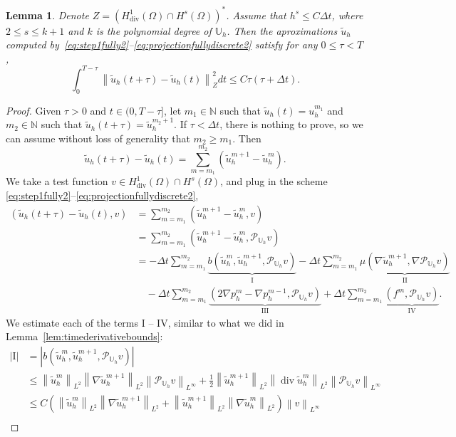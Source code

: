 \documentclass[10pt,letterpaper]{amsart}
\newcommand{\N}{\mathbb{N}}
\newcommand{\tu}{\widetilde{u}}
\newcommand\norm[1]{\left\lVert#1\right\rVert}
\newcommand{\Grad}{\nabla}
\newcommand{\Div}{\operatorname{div}}
\newcommand{\dom}{\Omega}
\newcommand{\Uh}{\mathbb{U}_h}
\newcommand{\PUh}{\mathcal{P}_{\Uh}}
\newtheorem{lemma}{Lemma}[section]
\theoremstyle{definition}{\newtheorem{definition}[lemma]{Definition}}
\numberwithin{equation}{section}
\begin{document}
\begin{lemma}
	\label{lem:timecontinuityutilde}
	Denote $Z = (H^1_{\Div}(\dom)\cap H^s(\dom))^*$. Assume that $h^s\leq C\Delta t$, where $2\leq s\leq k+1$ and $k$ is the polynomial degree of $\Uh$. Then the aproximations $\tu_h$ computed by~\eqref{eq:step1fully2}--\eqref{eq:projectionfullydiscrete2} satisfy for any $0\leq \tau <T$,  
	\begin{equation}
		\label{eq:timecontutildeweak}
		\int_0^{T-\tau}\norm{\tu_h(t+\tau)-\tu_h(t)}_Z^2 dt \leq C \tau (\tau+\Delta t).
	\end{equation}

\end{lemma}
\begin{proof}
	Given $\tau>0$ and $t\in (0,T-\tau]$, let $m_1\in \N$ such that $\tu_h(t) = u_h^{m_1}$ and $ m_2\in \N$ such that $\tu_h(t+\tau) = \tu_h^{m_2+1}$. If $\tau<\Delta t$, there is nothing to prove, so we can assume without loss of generality that $m_2\geq m_1$. Then
	\begin{equation*}
\tu_h(t+\tau)-\tu_h(t) = \sum_{m=m_1}^{m_2} (\tu_h^{m+1}-\tu_h^m).
	\end{equation*}
	We take a test function $v\in H^1_{\Div}(\dom)\cap H^s(\dom)$,  and plug in the scheme \eqref{eq:step1fully2}--\eqref{eq:projectionfullydiscrete2},
	\begin{align*}
		(\tu_h(t+\tau)-\tu_h(t),v) &= \sum_{m=m_1}^{m_2} (\tu_h^{m+1}-\tu_h^m,v)\\
		& = \sum_{m=m_1}^{m_2} (\tu_h^{m+1}-\tu_h^m,\PUh v)\\
		& = - \Delta t  \sum_{m=m_1}^{m_2} \underbrace{b(\tu_h^m,\tu_h^{m+1},\PUh v)}_{\text{I}} - \Delta t  \sum_{m=m_1}^{m_2} \underbrace{\mu(\Grad \tu_h^{m+1},\Grad \PUh v)}_{\text{II}} \\
		&\quad  - \Delta t  \sum_{m=m_1}^{m_2} \underbrace{(2\Grad p_h^{m}-\Grad p_h^{m-1},\PUh v)}_{\text{III}} + \Delta t  \sum_{m=m_1}^{m_2} \underbrace{(f^m,\PUh v)}_{\text{IV}} .
	\end{align*}
	We estimate each of the terms I -- IV, similar to what we did in Lemma~\ref{lem:timederivativebounds}:
	\begin{align*}
		|\text{I}|&=\left|b(\tu_h^m,\tu_h^{m+1},\PUh v)\right|\\
		& \leq \norm{\tu^m_h}_{L^2} \norm{\Grad\tu_h^{m+1}}_{L^2}\norm{\PUh v}_{L^\infty}+\frac12\norm{\tu^{m+1}_h}_{L^2} \norm{\Div\tu_h^{m}}_{L^2}\norm{\PUh v}_{L^\infty}\\
			& \leq C \left(\norm{\tu^m_h}_{L^2} \norm{\Grad\tu_h^{m+1}}_{L^2}+\norm{\tu^{m+1}_h}_{L^2} \norm{\Grad\tu_h^{m}}_{L^2}\right)\norm{ v}_{L^\infty}\\

\end{align*}
\end{proof}
\end{document}

